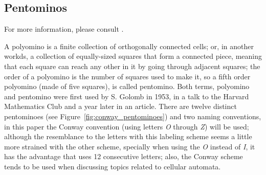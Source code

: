 
\subsection{Pentominos}
For more information, please consult \cite{language-and-automata-journal, life-wiki, rit-people}.

A polyomino is a finite collection of orthogonally connected cells; or, in
another workds, a collection of equally-sized squares that form a connected
piece, meaning that each square can reach any other in it by going through
adjacent squares; the order of a polyomino is the number of squares used to
make it, so a fifth order polyomino (made of five squares), is called
pentomino. Both terms, polyomino and pentomino were first used by S. Golomb in
1953, in a talk to the Harvard Mathematics Club and a year later in an article.
There are twelve distinct pentominoes (see
Figure~\ref{fig:conway_pentominoes}) and two naming conventions, in
this paper the Conway convention (using letters \textit{O} through \textit{Z})
will be used; although the resemblance to the letters with this labeling scheme
seems a little more strained with the other scheme, specially when using the
\textit{O} instead of \textit{I}, it has the advantage that uses 12
consecutive letters; also, the Conway scheme tends to be used when discussing
topics related to cellular automata.

